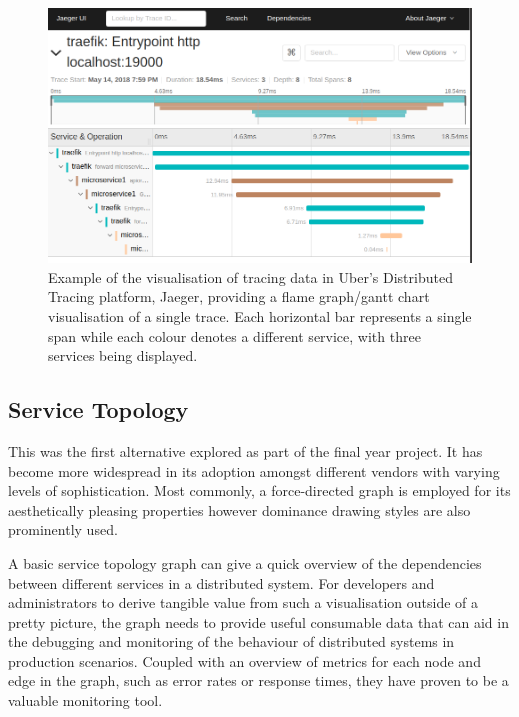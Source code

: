 \documentclass[12pt,pdftex,titlepage]{report}
\begin{document}
                \begin{figure}[htb!]
                    \centering
                    \includegraphics[scale=0.4]{jaeger}
                    \caption{Example of the visualisation of tracing data in Uber's Distributed Tracing platform, Jaeger\cite{jaeger}, providing
                    a flame graph/gantt chart visualisation of a single trace. Each horizontal bar represents a single span while each colour denotes
                    a different service, with three services being displayed.}
                    \label{fig:jaeger}
                \end{figure}
    
            \newpage
            \subsection{Service Topology}
                This was the first alternative explored as part of the final year project. It has become more widespread in its adoption amongst 
                different vendors with varying levels of sophistication\cite{risingstacktopo}\cite{kialitopo}. Most commonly, a force-directed 
                graph is employed for its aesthetically pleasing properties however dominance drawing styles are also prominently used.
        
                A basic service topology graph can give a quick overview of the dependencies between different services in a distributed
                system. For developers and administrators to derive tangible value from such a visualisation outside of a pretty picture, the graph
                needs to provide useful consumable data that can aid in the debugging and monitoring of the behaviour of distributed systems in production
                scenarios. Coupled with an overview of metrics for each node and edge in the graph, such as error rates or response times,
                they have proven to be a valuable monitoring tool.
\end{document}

